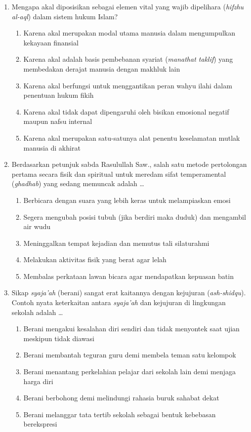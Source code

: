 \documentclass[12pt,a4paper]{article}
\begin{document}
\begin{enumerate}[leftmargin=*]
\item Mengapa akal diposisikan sebagai elemen vital yang wajib dipelihara (\textit{hifzhu al-aql}) dalam sistem hukum Islam?
    \begin{enumerate}[label=\alph*.]
        \item Karena akal merupakan modal utama manusia dalam mengumpulkan kekayaan finansial
        \item Karena akal adalah basis pembebanan syariat (\textit{manathat taklif}) yang membedakan derajat manusia dengan makhluk lain
        \item Karena akal berfungsi untuk menggantikan peran wahyu ilahi dalam penentuan hukum fikih
        \item Karena akal tidak dapat dipengaruhi oleh bisikan emosional negatif maupun nafsu internal
        \item Karena akal merupakan satu-satunya alat penentu keselamatan mutlak manusia di akhirat
    \end{enumerate}


\item Berdasarkan petunjuk sabda Rasulullah Saw., salah satu metode pertolongan pertama secara fisik dan spiritual untuk meredam sifat temperamental (\textit{ghadhab}) yang sedang memuncak adalah \dots
    \begin{enumerate}[label=\alph*.]
        \item Berbicara dengan suara yang lebih keras untuk melampiaskan emosi
        \item Segera mengubah posisi tubuh (jika berdiri maka duduk) dan mengambil air wudu
        \item Meninggalkan tempat kejadian dan memutus tali silaturahmi
        \item Melakukan aktivitas fisik yang berat agar lelah
        \item Membalas perkataan lawan bicara agar mendapatkan kepuasan batin
    \end{enumerate}

\item Sikap \textit{syaja'ah} (berani) sangat erat kaitannya dengan kejujuran (\textit{ash-shidqu}). Contoh nyata keterkaitan antara \textit{syaja'ah} dan kejujuran di lingkungan sekolah adalah \dots
    \begin{enumerate}[label=\alph*.]
        \item Berani mengakui kesalahan diri sendiri dan tidak menyontek saat ujian meskipun tidak diawasi
        \item Berani membantah teguran guru demi membela teman satu kelompok
        \item Berani menantang perkelahian pelajar dari sekolah lain demi menjaga harga diri
        \item Berani berbohong demi melindungi rahasia buruk sahabat dekat
        \item Berani melanggar tata tertib sekolah sebagai bentuk kebebasan berekspresi
    \end{enumerate}


\end{enumerate}
\end{document}
